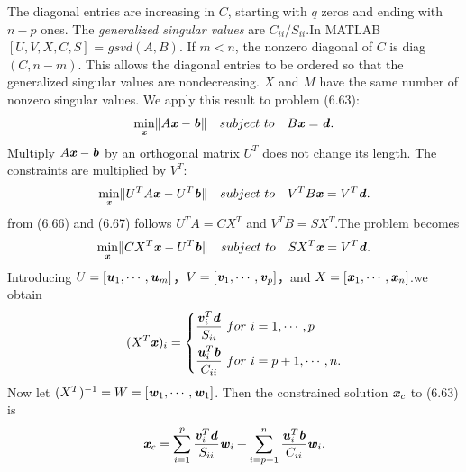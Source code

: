 The diagonal entries are increasing in $C$, starting with $q$ zeros and ending with $n-p$ ones. The \textit{generalized singular values} are $ C_{ii}/S_{ii}$.In MATLAB $[U, V, X, C, S]$ =  $gsvd(A,B)$. If $m<n$, the nonzero diagonal of $C$ is diag$(C, n-m)$. This allows the diagonal entries to be ordered so that the generalized singular values are nondecreasing. $X$ and $M$ have the same number of nonzero singular values. We apply this result to problem (6.63):
\begin{align*}
\min_{\textbf{\textit{x}}} \lVert A\textbf{\textit{x}}-\textbf{\textit{b}} \rVert \quad subject \ to \quad
B\textbf{\textit{x}} = \textbf{\textit{d}}.
\end{align*}
Multiply $ A\textbf{\textit{x}}-\textbf{\textit{b}}$ by an orthogonal matrix $U^{T}$ does not change its length. The constraints are multiplied by $V^{T}$:
\begin{align*}
\min_{\textbf{\textit{x}}} \lVert U^{T}A\textbf{\textit{x}}-U^{T}\textbf{\textit{b}} \rVert \quad subject \ to \quad
V^{T}B\textbf{\textit{x}} = V^{T}\textbf{\textit{d}}.
\end{align*}
from (6.66) and (6.67) follows $U^{T}A = CX^{T} $ and $V^{T}B=SX^{T} $.The problem becomes
\begin{align*}
\min_{\textbf{\textit{x}}} \lVert  CX^{T}\textbf{\textit{x}}-U^{T}\textbf{\textit{b}} \rVert \quad subject \ to \quad
SX^{T}\textbf{\textit{x}} = V^{T}\textbf{\textit{d}}.
\end{align*}
Introducing $U=[\textbf{\textit{u}}_{1},\cdots,\textbf{\textit{u}}_{m}]$，$V=[\textbf{\textit{v}}_{1},\cdots,\textbf{\textit{v}}_{p}]$，and $X=[\textbf{\textit{x}}_{1},\cdots,\textbf{\textit{x}}_{n}]$.we obtain
\begin{align*}
(X^{T}\textbf{\textit{x}})_{i} = 
\left\{
\begin{aligned}
\dfrac{\textbf{\textit{v}}^{T}_{i}\textbf{\textit{d}}}{S_{ii}} \ for \ i&=1,\cdots,p \\
\dfrac{\textbf{\textit{u}}^{T}_{i}\textbf{\textit{b}}}{C_{ii}} \ for \ i&=p+1,\cdots,n. 
\end{aligned}
\right.
\end{align*}
Now let $ (X^{T})^{-1} = W = [\textbf{\textit{w}}_{1},\cdots,\textbf{\textit{w}}_{1}]$. Then the constrained solution $\textbf{\textit{x}}_{c}$ to (6.63) is
\begin{align}
\textbf{\textit{x}}_{c} = 
\sum_{i=1}^p\dfrac{\textbf{\textit{v}}^{T}_{i}\textbf{\textit{d}}}{S_{ii}}\textbf{\textit{w}}_{i} + 
\sum_{i=p+1}^n\dfrac{\textbf{\textit{u}}^{T}_{i}\textbf{\textit{b}}}{C_{ii}}\textbf{\textit{w}}_{i}.
\end{align}
